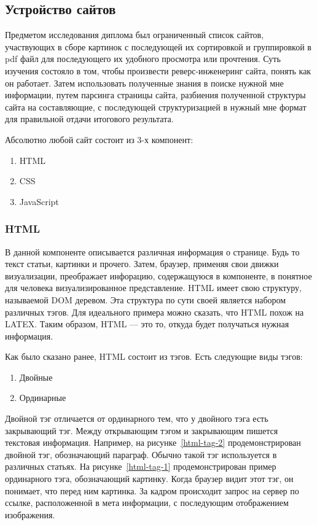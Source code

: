 \subsection{Устройство сайтов}
Предметом исследования диплома был ограниченный список сайтов,
участвующих в сборе картинок с последующей их сортировкой и группировкой в pdf файл для последующего их удобного просмотра или прочтения.
Суть изучения состояло в том, чтобы произвести реверс-инженеринг сайта, понять как он работает. 
Затем использовать полученные знания в поиске нужной мне информации, путем парсинга страницы сайта, разбиения полученной структуры сайта на составляющие,
с последующей структуризацией в нужный мне формат для правильной отдачи итогового результата.

Абсолютно любой сайт состоит из 3-х компонент:

\begin{enumerate}
    \item HTML
    \item CSS
    \item JavaScript
\end{enumerate}  

\subsubsection{HTML}
В данной компоненте описывается различная информация о странице. Будь то текст статьи, картинки и прочего.
Затем, браузер, применяя свои движки визуализации, преображает инфорацию, содержащуюся в компоненте, в понятное для человека визуализированное представление.
HTML имеет свою структуру, называемой DOM деревом. Эта структура по сути своей является набором различных тэгов.
Для идеального примера можно сказать, что HTML похож на LATEX. Таким образом, HTML --- это то, откуда будет получаться нужная информация.

Как было сказано ранее, HTML состоит из тэгов. Есть следующие виды тэгов:
\begin{enumerate}
    \item Двойные
    \item Ординарные
\end{enumerate} 

Двойной тэг отличается от ординарного тем, что у двойного тэга есть закрывающий тэг. Между открывающим тэгом и закрывающим пишется текстовая информация.
Например, на рисунке~\ref{html-tag-2} продемонстрирован двойной тэг, обозначающий параграф. Обычно такой тэг используется в различных статьях.
На рисунке~\ref{html-tag-1} продемонстрирован пример ординарного тэга, обозначающий картинку. Когда браузер видит этот тэг, он понимает, что перед ним картинка.
За кадром происходит запрос на сервер по ссылке, расположенной в мета информации, с последующим отображением изображения.

